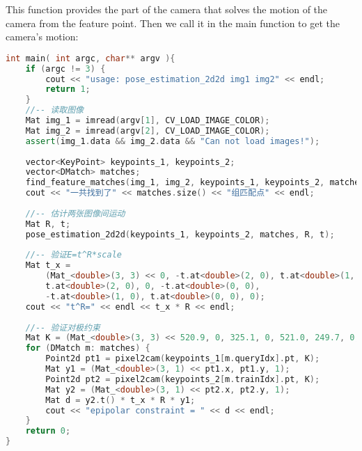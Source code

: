 This function provides the part of the camera that solves the motion of the camera from the feature point. Then we call it in the main function to get the camera's motion:
\begin{lstlisting}[language=c++,caption=slambook2/ch7/pose_estimation_2d2d.cpp （片段）]
int main( int argc, char** argv ){
    if (argc != 3) {
        cout << "usage: pose_estimation_2d2d img1 img2" << endl;
        return 1;
    }
    //-- 读取图像
    Mat img_1 = imread(argv[1], CV_LOAD_IMAGE_COLOR);
    Mat img_2 = imread(argv[2], CV_LOAD_IMAGE_COLOR);
    assert(img_1.data && img_2.data && "Can not load images!");
    
    vector<KeyPoint> keypoints_1, keypoints_2;
    vector<DMatch> matches;
    find_feature_matches(img_1, img_2, keypoints_1, keypoints_2, matches);
    cout << "一共找到了" << matches.size() << "组匹配点" << endl;
    
    //-- 估计两张图像间运动
    Mat R, t;
    pose_estimation_2d2d(keypoints_1, keypoints_2, matches, R, t);
    
    //-- 验证E=t^R*scale
    Mat t_x =
        (Mat_<double>(3, 3) << 0, -t.at<double>(2, 0), t.at<double>(1, 0),
        t.at<double>(2, 0), 0, -t.at<double>(0, 0),
        -t.at<double>(1, 0), t.at<double>(0, 0), 0);
    cout << "t^R=" << endl << t_x * R << endl;
    
    //-- 验证对极约束
    Mat K = (Mat_<double>(3, 3) << 520.9, 0, 325.1, 0, 521.0, 249.7, 0, 0, 1);
    for (DMatch m: matches) {
        Point2d pt1 = pixel2cam(keypoints_1[m.queryIdx].pt, K);
        Mat y1 = (Mat_<double>(3, 1) << pt1.x, pt1.y, 1);
        Point2d pt2 = pixel2cam(keypoints_2[m.trainIdx].pt, K);
        Mat y2 = (Mat_<double>(3, 1) << pt2.x, pt2.y, 1);
        Mat d = y2.t() * t_x * R * y1;
        cout << "epipolar constraint = " << d << endl;
    }
    return 0;
}
\end{lstlisting}


